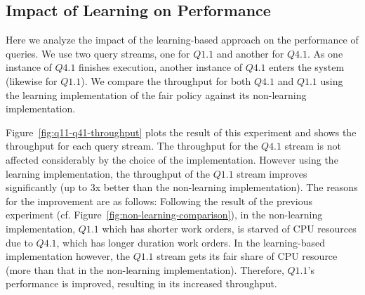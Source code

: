 \subsection{Impact of Learning on Performance}\label{ssec:learning-impact-perf}
Here we analyze the impact of the learning-based approach on the performance of queries. 
We use two query streams, one for $Q1.1$ and another for $Q4.1$.
As one instance of $Q4.1$ finishes execution, another instance of $Q4.1$ enters the system (likewise for $Q1.1$).
We compare the throughput for both $Q4.1$ and $Q1.1$ using the learning implementation of the fair policy against its non-learning implementation.



Figure~\ref{fig:q11-q41-throughput} plots the result of this experiment and shows the throughput for each query stream. 
The throughput for the $Q4.1$ stream is not affected considerably by the choice of the implementation. 
However using the learning implementation, the throughput of the $Q1.1$ stream improves significantly (up to 3x better than the non-learning implementation). 
The reasons for the improvement are as follows:
Following the result of the previous experiment (cf. Figure~\ref{fig:non-learning-comparison}), in the non-learning implementation, $Q1.1$ which has shorter work orders, is starved of CPU resources due to $Q4.1$, which has longer duration work orders. 
In the learning-based implementation however, the $Q1.1$ stream gets its fair share of CPU resource (more than that in the non-learning implementation). 
Therefore, $Q1.1$'s performance is improved, resulting in its increased throughput. 

